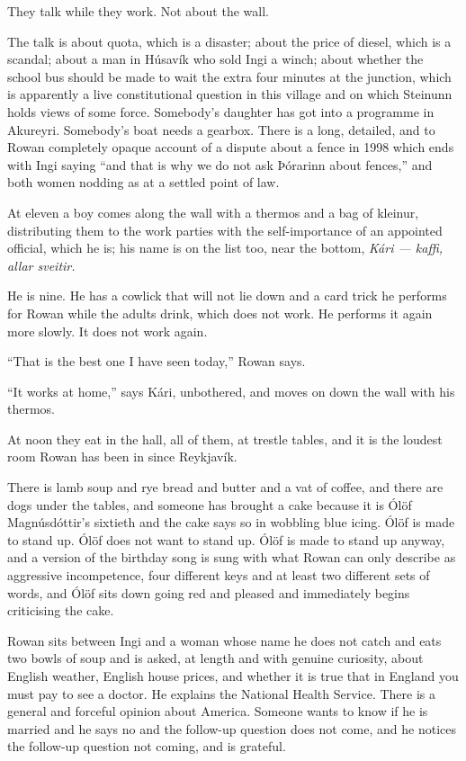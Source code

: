 \documentclass[11pt,oneside]{book}
\newcommand{\sceneline}{%
  \par\vspace{1.2em}
  \begin{center}
    \fontsize{11}{11}\selectfont \textbullet\quad\textbullet\quad\textbullet
  \end{center}
  \vspace{0.6em}\noindent\ignorespaces
}
\begin{document}
They talk while they work. Not about the wall.

The talk is about quota, which is a disaster; about the price of diesel,
which is a scandal; about a man in Húsavík who sold Ingi a winch; about
whether the school bus should be made to wait the extra four minutes at
the junction, which is apparently a live constitutional question in this
village and on which Steinunn holds views of some force. Somebody's
daughter has got into a programme in Akureyri. Somebody's boat needs a
gearbox. There is a long, detailed, and to Rowan completely opaque
account of a dispute about a fence in 1998 which ends with Ingi saying
``and that is why we do not ask Þórarinn about fences,'' and both women
nodding as at a settled point of law.

At eleven a boy comes along the wall with a thermos and a bag of
kleinur, distributing them to the work parties with the self-importance
of an appointed official, which he is; his name is on the list too, near
the bottom, \emph{Kári --- kaffi, allar sveitir.}

He is nine. He has a cowlick that will not lie down and a card trick he
performs for Rowan while the adults drink, which does not work. He
performs it again more slowly. It does not work again.

``That is the best one I have seen today,'' Rowan says.

``It works at home,'' says Kári, unbothered, and moves on down the wall
with his thermos.

\sceneline

At noon they eat in the hall, all of them, at trestle tables, and it is
the loudest room Rowan has been in since Reykjavík.

There is lamb soup and rye bread and butter and a vat of coffee, and
there are dogs under the tables, and someone has brought a cake because
it is Ólöf Magnúsdóttir's sixtieth and the cake says so in wobbling blue
icing. Ólöf is made to stand up. Ólöf does not want to stand up. Ólöf is
made to stand up anyway, and a version of the birthday song is sung with
what Rowan can only describe as aggressive incompetence, four different
keys and at least two different sets of words, and Ólöf sits down going
red and pleased and immediately begins criticising the cake.

Rowan sits between Ingi and a woman whose name he does not catch and
eats two bowls of soup and is asked, at length and with genuine
curiosity, about English weather, English house prices, and whether it
is true that in England you must pay to see a doctor. He explains the
National Health Service. There is a general and forceful opinion about
America. Someone wants to know if he is married and he says no and the
follow-up question does not come, and he notices the follow-up question
not coming, and is grateful.
\end{document}
